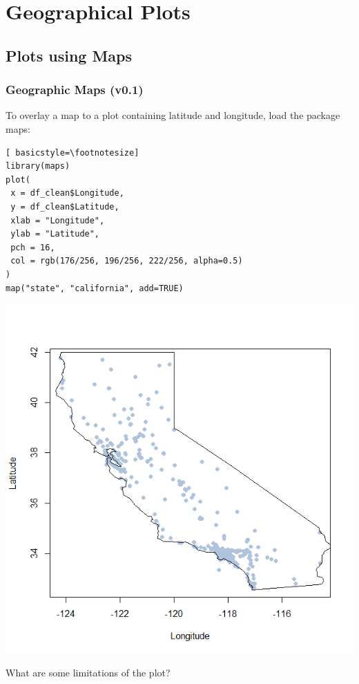 

\section[Geographical Plots]{Geographical Plots}
\subsection{Plots using Maps}

\begin{frame}
\frametitle{Geographic Maps (v0.1)}

To overlay a map to a plot containing latitude and longitude, load the package \ttfamily maps: \normalfont 

\begin{lstlisting}[ basicstyle=\footnotesize]
library(maps)
plot(
 x = df_clean$Longitude, 
 y = df_clean$Latitude,
 xlab = "Longitude",
 ylab = "Latitude",
 pch = 16,
 col = rgb(176/256, 196/256, 222/256, alpha=0.5)
)
map("state", "california", add=TRUE)
\end{lstlisting}

\newpage
	\begin{center}
		\includegraphics[scale=0.25]{images/geoplot_v0.png}
	\end{center}
What are some limitations of the plot?
\end{frame}

